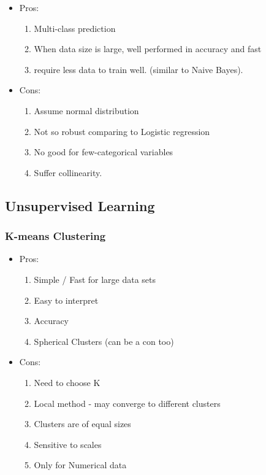 \documentclass[12pt]{amsart}
\numberwithin{equation}{section}
\theoremstyle{plain}
\theoremstyle{definition}
\begin{document}
\begin{itemize}
\item Pros: 

\begin{enumerate}
\item Multi-class prediction
\item When data size is large, well performed in accuracy and fast
\item require less data to train well. (similar to Naive Bayes).
\end{enumerate}

\item Cons:

\begin{enumerate}
\item Assume normal distribution
\item Not so robust comparing to Logistic regression
\item No good for few-categorical variables
\item Suffer collinearity.
\end{enumerate}

\end{itemize}

\subsection{Unsupervised Learning}

\subsubsection{K-means Clustering}

\begin{itemize}
\item Pros: 

\begin{enumerate}
\item Simple / Fast for large data sets
\item Easy to interpret
\item Accuracy
\item Spherical Clusters (can be a con too)
\end{enumerate}

\item Cons:

\begin{enumerate}
\item Need to choose K
\item Local method - may converge to different clusters
\item Clusters are of equal sizes
\item Sensitive to scales
\item Only for Numerical data
\end{enumerate}

\end{itemize}
\end{document}
